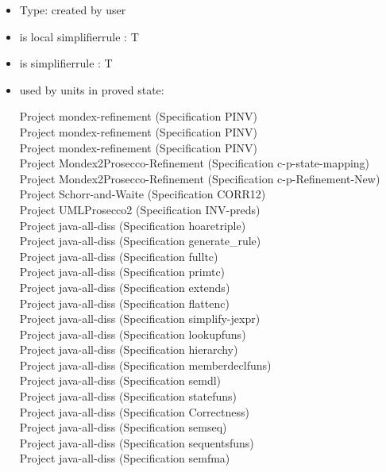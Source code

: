 \documentclass[a4paper]{article}
\begin{document}
\begin{itemize}

\item Type: created by user

\item is local simplifierrule : T
\item is simplifierrule : T
\item used by units in proved state:

Project mondex-refinement (Specification PINV) \\
Project mondex-refinement (Specification PINV) \\
Project mondex-refinement (Specification PINV) \\
Project Mondex2Prosecco-Refinement (Specification c-p-state-mapping) \\
Project Mondex2Prosecco-Refinement (Specification c-p-Refinement-New) \\
Project Schorr-and-Waite (Specification CORR12) \\
Project UMLProsecco2 (Specification INV-preds) \\
Project java-all-diss (Specification hoaretriple) \\
Project java-all-diss (Specification generate\_rule) \\
Project java-all-diss (Specification fulltc) \\
Project java-all-diss (Specification primtc) \\
Project java-all-diss (Specification extends) \\
Project java-all-diss (Specification flattenc) \\
Project java-all-diss (Specification simplify-jexpr) \\
Project java-all-diss (Specification lookupfuns) \\
Project java-all-diss (Specification hierarchy) \\
Project java-all-diss (Specification memberdeclfuns) \\
Project java-all-diss (Specification semdl) \\
Project java-all-diss (Specification statefuns) \\
Project java-all-diss (Specification Correctness) \\
Project java-all-diss (Specification semseq) \\
Project java-all-diss (Specification sequentsfuns) \\
Project java-all-diss (Specification semfma) \\

\end{itemize}
\end{document}
